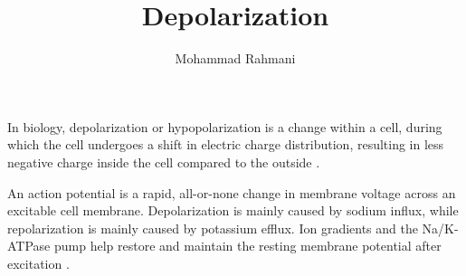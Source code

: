 \documentclass[a4paper]{article}
\title{Depolarization}
\date{}
\author{Mohammad Rahmani}
\begin{document}
    \maketitle
    In biology, depolarization or hypopolarization is a change within a cell, during which the cell undergoes a shift in electric charge distribution, resulting in less negative charge inside the cell compared to the outside .
    
    An action potential is a rapid, all-or-none change in membrane voltage across an excitable cell membrane. Depolarization is mainly caused by sodium influx, while repolarization is mainly caused by potassium efflux. Ion gradients and the Na/K-ATPase pump help restore and maintain the resting membrane potential after excitation \cite{grider-2023-physiology-action-potential}.
    
    
    
\end{document}
